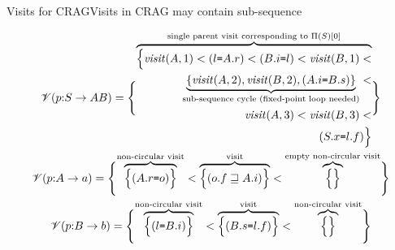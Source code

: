 \begin{frame}{Visits for CRAG}{Visits in CRAG may contain sub-sequence}


{
\scriptsize
\begin{equation}\label{eq:visit-sequence-for-crag-example}
\begin{gathered}
\mathscr{V}(p{:} S \rightarrow A B) = \Biggl\{
\overbrace{
\begin{aligned}
\Bigl\{
 \mathit{visit}(A, 1)  < (l \texttt{=} A.r) < (B.i \texttt{=} l) < \mathit{visit}(B, 1) < \\
\underbrace{\{ \mathit{visit}(A, 2)   , \mathit{visit}(B, 2), (A.i \texttt{=} B.s)  \}}_{\text{sub-sequence cycle (fixed-point loop needed)}}   < \\
\mathit{visit}(A, 3)  < \mathit{visit}(B, 3) < \\
(S.x \texttt{=} l.f)
\Bigr\}
\end{aligned}
}^{\text{single parent visit corresponding to $\Pi(S)[0]$}}
\Biggr \} \\
\mathscr{V}(p{:} A \rightarrow a) = \Biggl\{
\overbrace{\Big \{  (A.r \texttt{=} o)  \Big \}}^{\text{non-circular visit}} <
\overbrace{\Big \{  (o.f \sqsupseteq A.i)   \Big \} }^{\text{visit}} <
\overbrace{\Big \{    \Big \}}^{\text{empty non-circular visit}}
\Biggr\} \\
\mathscr{V}(p{:} B \rightarrow b) = \Biggl\{
\overbrace{\Big \{  
(l \texttt{=} B.i )
\Big \}}^{\text{non-circular visit}} <
\overbrace{\Big \{  (B.s \texttt{=} l.f)  \Big \} }^{\text{visit}} <
\overbrace{\Big \{    \Big \}}^{\text{non-circular visit}}
\Biggr\}
\end{gathered}
\end{equation}
}
 
\end{frame}




